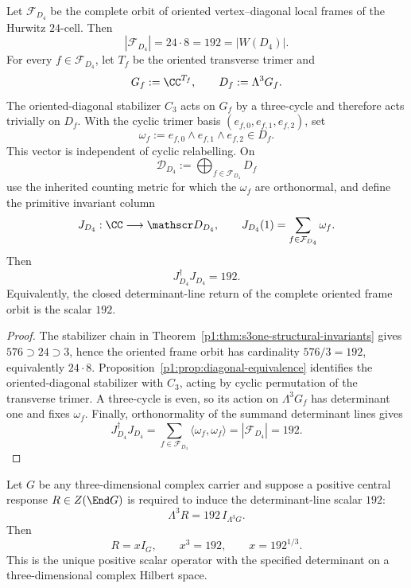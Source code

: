 \documentclass[11pt]{article}
\begin{document}
\begin{theorem}
\label{p1:thm:v559-d4-oriented-frame-determinant-return}
Let \(\mathcal F_{D_4}\) be the complete orbit of oriented vertex--diagonal
local frames of the Hurwitz \(24\)-cell.  Then
\[
 |\mathcal F_{D_4}|=24\cdot8=192=|W(D_4)|.
\]
For every \(f\in\mathcal F_{D_4}\), let \(T_f\) be the oriented transverse
trimer and
\[
 G_f:=\CC^{T_f},\qquad D_f:=\Lambda^3G_f.
\]
The oriented-diagonal stabilizer \(C_3\) acts on \(G_f\) by a three-cycle and
therefore acts trivially on \(D_f\).  With the cyclic trimer basis
\((e_{f,0},e_{f,1},e_{f,2})\), set
\[
 \omega_f:=e_{f,0}\wedge e_{f,1}\wedge e_{f,2}\in D_f.
\]
This vector is independent of cyclic relabelling.  On
\[
 \mathscr D_{D_4}:=\bigoplus_{f\in\mathcal F_{D_4}}D_f
\]
use the inherited counting metric for which the \(\omega_f\) are orthonormal,
and define the primitive invariant column
\[
 J_{D_4}:\CC\longrightarrow\mathscr D_{D_4},\qquad
 J_{D_4}(1)=\sum_{f\in\mathcal F_{D_4}}\omega_f.
\]
Then
\[
 \boxed{J_{D_4}^{\dagger}J_{D_4}=192.}
\]
Equivalently, the closed determinant-line return of the complete oriented
frame orbit is the scalar \(192\).
\end{theorem}

\begin{proof}
The stabilizer chain in
Theorem~\ref{p1:thm:s3one-structural-invariants} gives
\(576\supset24\supset3\), hence the oriented frame orbit has cardinality
\(576/3=192\), equivalently \(24\cdot8\).  Proposition~\ref{p1:prop:diagonal-equivalence}
identifies the oriented-diagonal stabilizer with \(C_3\), acting by cyclic
permutation of the transverse trimer.  A three-cycle is even, so its action on
\(\Lambda^3G_f\) has determinant one and fixes \(\omega_f\).  Finally,
orthonormality of the summand determinant lines gives
\[
 J_{D_4}^{\dagger}J_{D_4}
 =\sum_{f\in\mathcal F_{D_4}}\langle\omega_f,\omega_f\rangle
 =|\mathcal F_{D_4}|=192.
\]
\end{proof}

\begin{corollary}
\label{p1:cor:v559-positive-central-rank3-lift}
Let \(G\) be any three-dimensional complex carrier and suppose a positive
central response \(R\in Z(\End G)\) is required to induce the determinant-line
scalar \(192\):
\[
 \Lambda^3R=192\,I_{\Lambda^3G}.
\]
Then
\[
 \boxed{R=xI_G,\qquad x^3=192,\qquad x=192^{1/3}.}
\]
This is the unique positive scalar operator with the specified determinant
on a three-dimensional complex Hilbert space.
\end{corollary}
\end{document}
